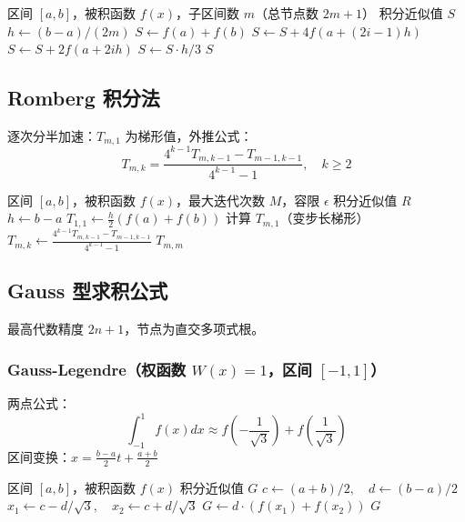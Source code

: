 \documentclass{article}
\begin{document}
\begin{algorithm}[H]
\caption{复合Simpson求积}
\begin{algorithmic}[1]
\REQUIRE 区间 \([a,b]\)，被积函数 \(f(x)\)，子区间数 \(m\)（总节点数 \(2m+1\)）
\ENSURE 积分近似值 \(S\)
\STATE \(h \gets (b-a)/(2m)\)
\STATE \(S \gets f(a) + f(b)\)
    \STATE \(S \gets S + 4f(a + (2i-1)h)\)
\ENDFOR
{}
    \STATE \(S \gets S + 2f(a + 2i h)\)
\ENDFOR
\STATE \(S \gets S \cdot h / 3\)
\RETURN \(S\)
\end{algorithmic}
\end{algorithm}

\subsection{Romberg 积分法}

逐次分半加速：\(T_{m,1}\) 为梯形值，外推公式：
\[
T_{m,k} = \frac{4^{k-1} T_{m,k-1} - T_{m-1,k-1}}{4^{k-1} - 1}, \quad k \ge 2
\]

\begin{algorithm}[H]
\caption{Romberg 积分}
\begin{algorithmic}[1]
\REQUIRE 区间 \([a,b]\)，被积函数 \(f(x)\)，最大迭代次数 \(M\)，容限 \(\epsilon\)
\ENSURE 积分近似值 \(R\)
\STATE \(h \gets b-a\)
\STATE \(T_{1,1} \gets \frac{h}{2}(f(a)+f(b))\)
    \STATE 计算 \(T_{m,1}\)（变步长梯形）
        \STATE \(T_{m,k} \gets \frac{4^{k-1}T_{m,k-1} - T_{m-1,k-1}}{4^{k-1}-1}\)
    \ENDFOR
        \RETURN \(T_{m,m}\)
    \ENDIF
\ENDFOR
\end{algorithmic}
\end{algorithm}

\subsection{Gauss 型求积公式}

最高代数精度 \(2n+1\)，节点为直交多项式根。

\subsubsection{Gauss-Legendre（权函数 \(W(x)=1\)，区间 \([-1,1]\)）}
两点公式：
\[
\int_{-1}^1 f(x)dx \approx f\left(-\frac{1}{\sqrt{3}}\right) + f\left(\frac{1}{\sqrt{3}}\right)
\]
区间变换：\(x = \frac{b-a}{2}t + \frac{a+b}{2}\)

\begin{algorithm}[H]
\caption{Gauss-Legendre 两点求积}
\begin{algorithmic}[1]
\REQUIRE 区间 \([a,b]\)，被积函数 \(f(x)\)
\ENSURE 积分近似值 \(G\)
\STATE \(c \gets (a+b)/2,\quad d \gets (b-a)/2\)
\STATE \(x_1 \gets c - d/\sqrt{3},\quad x_2 \gets c + d/\sqrt{3}\)
\STATE \(G \gets d \cdot (f(x_1) + f(x_2))\)
\RETURN \(G\)
\end{algorithmic}
\end{algorithm}
\end{document}
